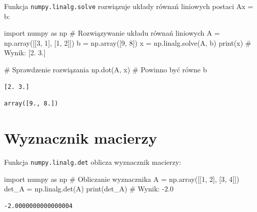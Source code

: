 \documentclass[
  polish,
  letterpaper,
  DIV=11,
  numbers=noendperiod]{scrreprt}
\newenvironment{Shaded}{\begin{snugshade}}{\end{snugshade}}
\newcommand{\BuiltInTok}[1]{\textcolor[rgb]{0.00,0.23,0.31}{#1}}
\newcommand{\CommentTok}[1]{\textcolor[rgb]{0.37,0.37,0.37}{#1}}
\newcommand{\DecValTok}[1]{\textcolor[rgb]{0.68,0.00,0.00}{#1}}
\newcommand{\ImportTok}[1]{\textcolor[rgb]{0.00,0.46,0.62}{#1}}
\newcommand{\NormalTok}[1]{\textcolor[rgb]{0.00,0.23,0.31}{#1}}
\newcommand{\OperatorTok}[1]{\textcolor[rgb]{0.37,0.37,0.37}{#1}}
\begin{document}
Funkcja \texttt{numpy.linalg.solve} rozwiązuje układy równań liniowych
postaci Ax = b:

\begin{Shaded}
\begin{Highlighting}[]
\ImportTok{import}\NormalTok{ numpy }\ImportTok{as}\NormalTok{ np}
\CommentTok{\# Rozwiązywanie układu równań liniowych}
\NormalTok{A }\OperatorTok{=}\NormalTok{ np.array([[}\DecValTok{3}\NormalTok{, }\DecValTok{1}\NormalTok{], [}\DecValTok{1}\NormalTok{, }\DecValTok{2}\NormalTok{]])}
\NormalTok{b }\OperatorTok{=}\NormalTok{ np.array([}\DecValTok{9}\NormalTok{, }\DecValTok{8}\NormalTok{])}
\NormalTok{x }\OperatorTok{=}\NormalTok{ np.linalg.solve(A, b)}
\BuiltInTok{print}\NormalTok{(x)  }\CommentTok{\# Wynik: [2. 3.]}

\CommentTok{\# Sprawdzenie rozwiązania}
\NormalTok{np.dot(A, x)  }\CommentTok{\# Powinno być równe b}
\end{Highlighting}
\end{Shaded}

\begin{verbatim}
[2. 3.]
\end{verbatim}

\begin{verbatim}
array([9., 8.])
\end{verbatim}

\section{Wyznacznik macierzy}\label{wyznacznik-macierzy}

Funkcja \texttt{numpy.linalg.det} oblicza wyznacznik macierzy:

\begin{Shaded}
\begin{Highlighting}[]
\ImportTok{import}\NormalTok{ numpy }\ImportTok{as}\NormalTok{ np}
\CommentTok{\# Obliczanie wyznacznika}
\NormalTok{A }\OperatorTok{=}\NormalTok{ np.array([[}\DecValTok{1}\NormalTok{, }\DecValTok{2}\NormalTok{], [}\DecValTok{3}\NormalTok{, }\DecValTok{4}\NormalTok{]])}
\NormalTok{det\_A }\OperatorTok{=}\NormalTok{ np.linalg.det(A)}
\BuiltInTok{print}\NormalTok{(det\_A)  }\CommentTok{\# Wynik: {-}2.0}
\end{Highlighting}
\end{Shaded}

\begin{verbatim}
-2.0000000000000004
\end{verbatim}
\end{document}
